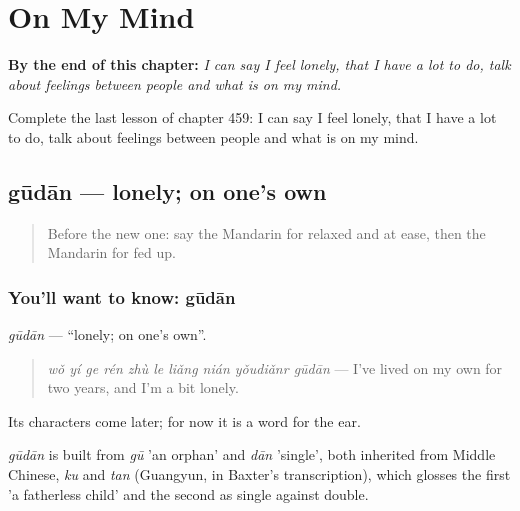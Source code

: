 
\chapter{On My Mind}
\label{ch:zh-on-my-mind}

\begin{chapteropening}
\textbf{By the end of this chapter:} \emph{I can say I feel lonely, that I have a lot to do, talk about feelings between people and what is on my mind.}

Complete the last lesson of chapter 459: I can say I feel lonely, that I have a lot to do, talk about feelings between people and what is on my mind.
\end{chapteropening}

\section[gūdān]{gūdān — lonely; on one's own}

\label{lesson:ZH-C459-gudan}



\begin{quote}
Before the new one: say the Mandarin for relaxed and at ease, then the Mandarin for fed up.
\end{quote}

\subsection*{You'll want to know: gūdān}
\emph{gūdān} — \textquotedblleft{}lonely; on one's own\textquotedblright{}.

\begin{quote}
\emph{wǒ yí ge rén zhù le liǎng nián yǒudiǎnr gūdān} — I've lived on my own for two years, and I'm a bit lonely.
\end{quote}

Its characters come later; for now it is a word for the ear.

\begin{cousinweb}
\emph{gūdān} is built from \emph{gū} 'an orphan' and \emph{dān} 'single', both inherited from Middle Chinese, \emph{ku} and \emph{tan} (Guangyun, in Baxter's transcription), which glosses the first 'a fatherless child' and the second as single against double.
\end{cousinweb}

